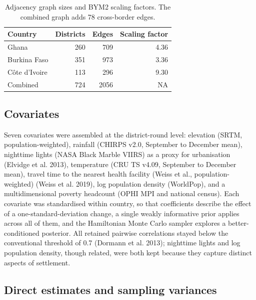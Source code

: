 \documentclass{article}
\begin{document}
\begin{longtable}[t]{lrrr}
\caption{\label{tab:spatial}\label{tab:spatial}Adjacency graph sizes and BYM2 scaling factors. The combined graph adds 78 cross-border edges.}\\
\toprule
Country & Districts & Edges & Scaling factor\\
\midrule
Ghana & 260 & 709 & 4.36\\
Burkina Faso & 351 & 973 & 3.36\\
Côte d'Ivoire & 113 & 296 & 9.30\\
Combined & 724 & 2056 & NA\\
\bottomrule
\end{longtable}

\subsection{Covariates}\label{covariates}

Seven covariates were assembled at the district-round level: elevation
(SRTM, population-weighted), rainfall (CHIRPS v2.0, September to
December mean), nighttime lights (NASA Black Marble VIIRS) as a proxy
for urbanisation (Elvidge et al. 2013), temperature (CRU TS v4.09,
September to December mean), travel time to the nearest health facility
(Weiss et al., population-weighted) ({Weiss et al.} 2019), log
population density (WorldPop), and a multidimensional poverty headcount
(OPHI MPI and national census). Each covariate was standardised within
country, so that coefficients describe the effect of a
one-standard-deviation change, a single weakly informative prior applies
across all of them, and the Hamiltonian Monte Carlo sampler explores a
better-conditioned posterior. All retained pairwise correlations stayed
below the conventional threshold of 0.7 ({Dormann et al.} 2013);
nighttime lights and log population density, though related, were both
kept because they capture distinct aspects of settlement.

\subsection{Direct estimates and sampling
variances}\label{direct-estimates-and-sampling-variances}
\end{document}
